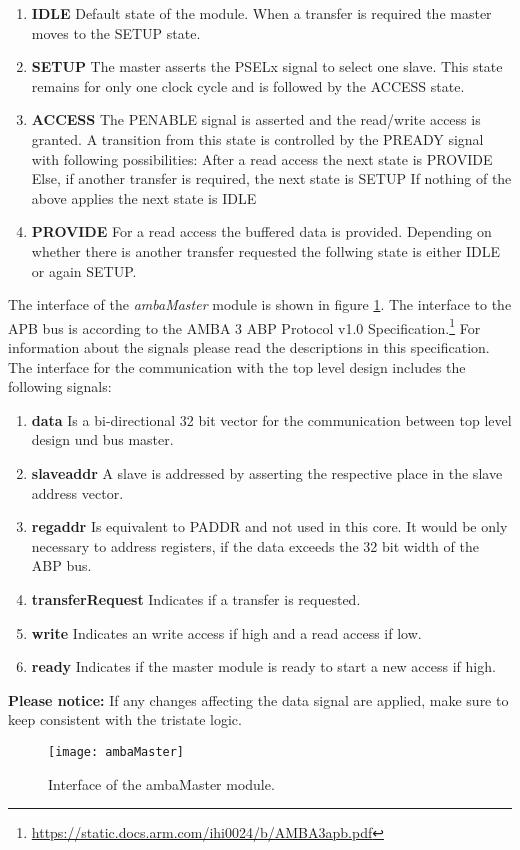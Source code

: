 \documentclass[%
	a4paper,
]
{article}
\begin{document}
\begin{enumerate}
	\item{\textbf{IDLE}} Default state of the module. When a transfer is required the master moves to the SETUP state.
	\item{\textbf{SETUP}} The master asserts the PSELx signal to select one slave. This state remains for only one clock cycle and is followed by the ACCESS state.
	\item{\textbf{ACCESS}} The PENABLE signal is asserted and the read/write access is granted. A transition from this state is controlled by the PREADY signal with following possibilities:
		\subitem After a read access the next state is PROVIDE
		\subitem Else, if another transfer is required, the next state is SETUP
		\subitem If nothing of the above applies the next state is IDLE
	\item{\textbf{PROVIDE}} For a read access the buffered data is provided. Depending on whether there is another transfer requested the follwing state is either IDLE or again SETUP.
\end{enumerate}

The interface of the \textit{ambaMaster} module is shown in figure \ref{fig:ambaMaster}. The interface to the APB bus is according to the AMBA 3 ABP Protocol v1.0 Specification.\footnote{\url{https://static.docs.arm.com/ihi0024/b/AMBA3apb.pdf}} For information about the signals please read the descriptions in this specification. The interface for the communication with the top level design includes the following signals:

\begin{enumerate}
	\item{\textbf{data}} Is a bi-directional 32 bit vector for the communication between top level design und bus master. 
	\item{\textbf{slaveaddr}} A slave is addressed by asserting the respective place in the slave address vector.
	\item{\textbf{regaddr}} Is equivalent to PADDR and not used in this core. It would be only necessary to address registers, if the data exceeds the 32 bit width of the ABP bus.
	\item{\textbf{transferRequest}} Indicates if a transfer is requested.
	\item{\textbf{write}} Indicates an write access if high and a read access if low.
	\item{\textbf{ready}} Indicates if the master module is ready to start a new access if high.
\end{enumerate}
\textbf{Please notice:} If any changes affecting the data signal are applied, make sure to keep consistent with the tristate logic.
\begin{figure}[h!]
	\centering
	\texttt{[image: ambaMaster]}
	\caption{Interface of the ambaMaster module.}
	\label{fig:ambaMaster}
\end{figure}
\end{document}
